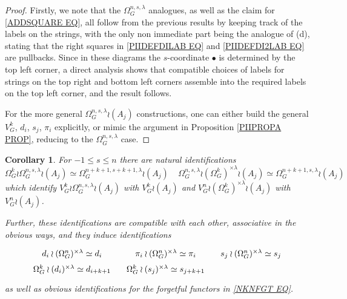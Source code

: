 \documentclass[a4paper,10pt
,draft
]{article}%
\numberwithin{equation}{section}
\numberwithin{figure}{section}
\newtheorem{corollary}[equation]{Corollary}%
\theoremstyle{definition} %
\newcommand{\1}{\ensuremath{\mathbbm 1}}%
\begin{document}
\begin{proof}
	Firstly, we note that the $\Omega_{G}^{n,s,\lambda}$
	analogues, as well as the claim for \eqref{ADDSQUARE EQ}, all follow from the previous results
	by keeping track of the labels on the strings, 
	with the only non immediate part
	being the analogue of (d), stating that the right squares in 
	\eqref{PIIDEFDILAB EQ} and
	\eqref{PIIDEFDI2LAB EQ} are pullbacks. Since in these diagrams the $s$-coordinate $\bullet$ is determined by the top left corner, a direct analysis shows that compatible choices of labels for strings on the top right and bottom left corners assemble into the required labels on the top left corner, 
	and the result follows.
		
	For the more general $\Omega_{G}^{n,s,\lambda} \wr (A_j)$ constructions, one can either build the
	general $V_G^k$, $d_i$, $s_j$, $\pi_i$ 
	explicitly, or mimic the argument in Proposition \ref{PIIPROPA PROP}, reducing to the 
	$\Omega_{G}^{n,s,\lambda}$ case.
\end{proof}

\begin{corollary}\label{LABIDEN COR}
For $-1 \leq s \leq n$ there are natural identifications
\begin{equation}\label{MOREIDENT1 EQ}
	\Omega_G^{k} \wr \Omega_G^{n,s,\lambda} \wr (A_j) \simeq
	\Omega_G^{n+k+1,s+k+1,\lambda} \wr (A_j)
 \phantom{||||}
	\Omega_G^{n,s,\lambda} \wr 
	(\Omega_G^k)^{\times \lambda}
	\wr (A_j)
\simeq
	\Omega_G^{n+k+1,s,\lambda} \wr (A_j)
\end{equation}
which identify 
$V^k_G \wr \Omega_G^{n,s,\lambda} \wr (A_j) $ with 
$V^k_G \wr (A_j) $
and 
$V_G^n \wr (\Omega_G^k)^{\times \lambda}\wr (A_j) $
with 
$V_G^n \wr (A_j)$.

Further, these identifications are compatible with each other, associative in the obvious ways, and they induce identifications
\begin{equation}\label{MOREIDENT2 EQ}
\begin{tikzcd}[row sep=0, column sep = 10]
	d_i \wr (\Omega_G^{n})^{\times \lambda} \simeq d_i 
&
	\pi_i \wr (\Omega_G^{n})^{\times \lambda} \simeq \pi_i 
&
	s_j \wr (\Omega_G^{n})^{\times \lambda} \simeq s_j 
\\
	\Omega_G^k \wr (d_i)^{\times \lambda} \simeq d_{i+k+1} 
&
	\Omega_G^k \wr (s_j)^{\times \lambda} \simeq s_{j+k+1}
\end{tikzcd}
\end{equation}
as well as obvious identifications for the forgetful functors
in \eqref{NKNFGT EQ}.
\end{corollary}
\end{document}
